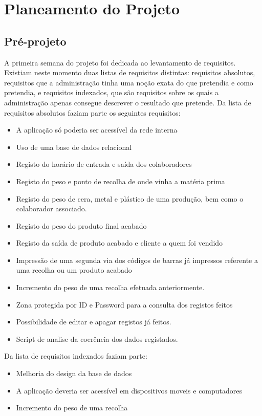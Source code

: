 \chapter{Planeamento do Projeto} 
\label{cap:3}

\section{Pré-projeto}
A primeira semana do projeto foi dedicada ao levantamento de requisitos. Existiam neste momento duas listas de requisitos distintas: requisitos absolutos\label{sym:REQUISITO_ABSOLUTO}, requisitos que a administração tinha uma noção exata do que pretendia e como pretendia, e requisitos indexados\label{sym:REQUISITO_INDEXADO}, que são requisitos sobre os quais a administração apenas consegue descrever o resultado que pretende.
Da lista de requisitos absolutos faziam parte os seguintes requisitos:
    \begin{itemize}
        \item A aplicação só poderia ser acessível da rede interna
        \item Uso de uma base de dados relacional
        \item Registo do horário de entrada e saída dos colaboradores
        \item Registo do peso e ponto de recolha de onde vinha a matéria prima
        \item Registo do peso de cera, metal e plástico de uma produção, bem como o colaborador associado.
        \item Registo do peso do produto final acabado
        \item Registo da saída de produto acabado e cliente a quem foi vendido
        \item Impressão de uma segunda via dos códigos de barras já impressos referente a uma recolha ou um produto acabado
        \item Incremento do peso de uma recolha efetuada anteriormente.
        \item Zona protegida por ID e Password para a consulta dos registos feitos
        \item Possibilidade de editar e apagar registos já feitos.
        \item Script de analise da coerência dos dados registados.
    \end{itemize}
Da lista de requisitos indexados faziam parte:
    \begin{itemize}
        \item Melhoria do design da base de dados
        \item A aplicação deveria ser acessível em dispositivos moveis e computadores
        \item Incremento do peso de uma recolha
    \end{itemize}


